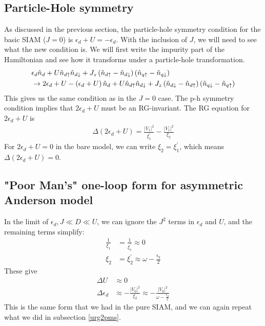 \documentclass[12pt,twoside]{article}
\numberwithin{equation}{section}
\begin{document}
\subsection{Particle-Hole symmetry}
As discussed in the previous section, the particle-hole symmetry condition for the basic SIAM (\(J=0\)) is \(\epsilon_d + U = -\epsilon_d\). With the inclusion of \(J\), we will need to see what the new condition is. We will first write the impurity part of the Hamiltonian and see how it transforms under a particle-hole transformation.
\begin{equation}\begin{aligned}
	&\epsilon_d \hat n_d + U \hat n_{d\uparrow}\hat n_{d\downarrow} + J_z \left(\hat n_{d\uparrow} - \hat n_{d\downarrow}\right)\left(\hat n_{q\uparrow} - \hat n_{q\downarrow}\right)\\
&	\rightarrow 2\epsilon_d + U  -\left(\epsilon_d + U\right)\hat n_d + U \hat n_{d\uparrow}\hat n_{d\downarrow} + J_z \left(\hat n_{d\downarrow} - \hat n_{d\uparrow}\right)\left(\hat n_{q\downarrow} - \hat n_{q\uparrow}\right)\\
\end{aligned}\end{equation}
This gives us the same condition as in the \(J=0\) case. The p-h symmetry condition implies that \(2\epsilon_d + U\) must be an RG-invariant. The RG equation for \(2\epsilon_d + U\) is
\begin{equation}\begin{aligned}
	\Delta \left(2\epsilon_d + U\right) = \frac{|V_1|^2}{\xi_1^\prime} - \frac{|V_1|^2}{\xi_2}
\end{aligned}\end{equation}
For \(2\epsilon_d + U=0\) in the bare model, we can write \(\xi_2 = \xi_1^\prime\), which means \(\Delta \left(2\epsilon_d + U\right) = 0\).
\subsection{"Poor Man's" one-loop form for asymmetric Anderson model}
In the limit of \(\epsilon_d, J \ll D \ll U \), we can ignore the \(J^2\) terms in \(\epsilon_d\) and \(U\), and the remaining terms simplify:
\begin{equation}\begin{aligned}
	\frac{1}{\xi_1} &= \frac{1}{\xi_1^\prime} \approx 0\\
	\xi_2 &= \xi_2^\prime \approx \omega - \frac{\epsilon_q}{2}
\end{aligned}\end{equation}
These give
\begin{equation}\begin{aligned}
	\Delta U &\approx 0 \\
	\Delta \epsilon_d &\approx - \frac{|V_0|^2}{\xi_2} \approx -\frac{|V_0|^2}{\omega - \frac{\epsilon_q}{2}}
\end{aligned}\end{equation}
This is the same form that we had in the pure SIAM, and we can again repeat what we did in subsection \ref{urg2pms}.
\end{document}
